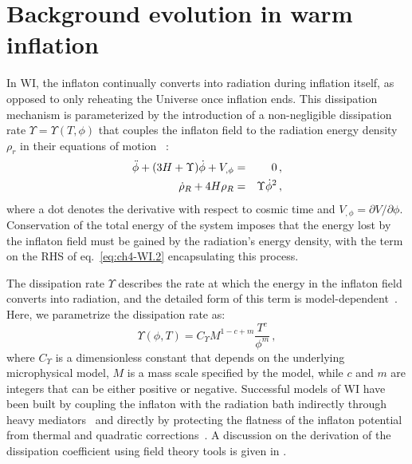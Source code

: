 \section{Background evolution in warm inflation
\label{sec:ch4-background_ev}}

In WI, the inflaton continually converts into radiation during inflation itself, as opposed to only reheating the Universe once inflation ends. This dissipation mechanism is parameterized by the introduction of a non-negligible dissipation rate $\Upsilon = \Upsilon(T,\phi)$ that couples the inflaton field to the radiation energy density $\rho_r$ in their equations of motion ~\cite{Berera:1995wh, Berera:1995ie}:
\begin{eqnarray}
    \Ddot{\phi}+(3H+\Upsilon)\dot{\phi}+V_{,\phi} &=& 0\,,\label{eq:ch4-WI.1}\\
    \Dot{\rho}_R+4H\rho_R &=& \Upsilon \Dot{\phi}^2\,,  \label{eq:ch4-WI.2}
\end{eqnarray}
where a dot denotes the derivative with respect to cosmic time and $V_{,\phi}=\partial V/\partial \phi$. Conservation of the total energy of the system imposes that the energy lost by the inflaton field must be gained by the radiation's energy density, with the term on the RHS of eq.~\eqref{eq:ch4-WI.2} encapsulating this process.

The dissipation rate $\Upsilon$ describes the rate at which the energy in the inflaton field converts into radiation, and the detailed form of this term is model-dependent~\cite{Berera:1998gx, Yokoyama:1998ju}. Here, we parametrize the dissipation rate as:
\begin{equation}
    \Upsilon(\phi, T)=C_\Upsilon M^{1-c+m} \frac{T^c}{\phi^m}\,,
    \label{eq:ch4-Upsilon}
\end{equation}
where $C_\Upsilon$ is a dimensionless constant that depends on the underlying microphysical model, $M$ is a mass scale specified by the model, while $c$ and $m$ are integers that can be either positive or negative. Successful models of WI have been built by coupling the inflaton with the radiation bath indirectly through heavy mediators~\cite{Berera:2002sp, Moss:2006gt, Berera:2008ar} and directly by protecting the flatness of the inflaton potential from thermal and quadratic corrections~\cite{Bastero-Gil:2016qru, Bastero-Gil:2019gao, Berghaus:2019whh}. A discussion on the derivation of the dissipation coefficient using field theory tools is given in \cite{Bastero-Gil:2010dgy}.

